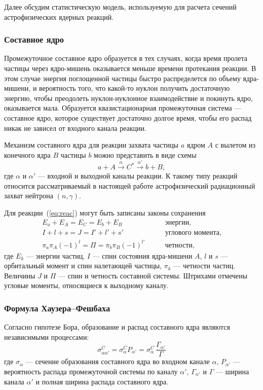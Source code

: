 Далее обсудим статистическую модель, используемую для расчета сечений астрофизических ядерных реакций.

\subsubsection{Составное ядро}
Промежуточное составное ядро образуется в тех случаях, когда время пролета частицы через ядро-мишень оказывается меньше времени протекания реакции. В этом случае энергия поглощенной частицы быстро распределется по объему ядра-мишени, и вероятность того, что какой-то нуклон получить достаточную энергию, чтобы преодолеть нуклон-нуклонное взаимодействие и покинуть ядро, оказывается мала. Образуется квазистационарная промежуточная система --- составное ядро, которое существует достаточно долгое время, чтобы его распад никак не зависел от входного канала реакции.

Механизм составного ядра для реакции захвата частицы $a$ ядром $A$ с вылетом из конечного ядра $B$ частицы $b$ можно представить в виде схемы
\begin{equation}
a + A \xrightarrow{\alpha} C^* \xrightarrow{\alpha'} b + B,
\label{eq:reac}
\end{equation}
где $\alpha$ и $\alpha'$ --- входной и выходной каналы реакции. К такому типу реакций относится рассматриваемый в настоящей работе астрофизический радиационный захват нейтрона $(n,\gamma)$. 

Для реакции~(\ref{eq:reac}) могут быть записаны законы сохранения
\begin{equation}
\begin{aligned}
E_a + E_A = E_C = E_b + E_B& \qquad \text{энергии,}\\
I + l + s = J = I' + l' + s'& \qquad \text{углового момента,}\\
\pi_a \pi_A (-1)^l = \Pi = \pi_b \pi_B (-1)^{l'}& \qquad \text{четности,}
\end{aligned}
\end{equation}
где $E_k$ --- энергии частиц, $I$ --- спин состояния ядра-мишени $A$, $l$ и $s$ --- орбитальный момент и спин налетающей частицы, $\pi_k$ --- четности частиц. Величины $J$ и $\Pi$ --- спин и четность составной системы. Штрихами отмечены угловые моменты, относящиеся к выходному каналу.

\subsubsection{Формула Хаузера--Фешбаха}
Согласно гипотезе Бора, образование и распад составного ядра являются независимыми процессами:
\begin{equation}
\displaystyle
\sigma^C_{\alpha \alpha'} = \sigma^C_{\alpha}P_{\alpha'} = 
\sigma^C_{\alpha} \, \frac{\Gamma_{\alpha'}}{\Gamma}
\end{equation}
где $\sigma_{\alpha}$ --- сечение образования составного ядра во входном канале $\alpha$, $P_{\alpha'}$ --- вероятность распада промежуточной системы по каналу $\alpha'$, $\Gamma_{\alpha'}$ и $\Gamma$ --- ширина канала $\alpha'$ и полная ширина распада составного ядра.

